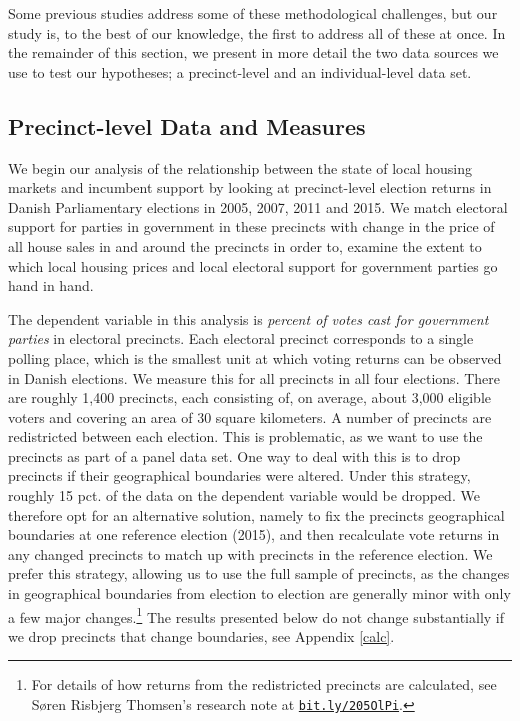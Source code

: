 \documentclass[12pt,a4paper]{article}
\begin{document}
	Some previous studies address some of these methodological challenges, but our study is, to the best of our knowledge, the first to address all of these at once. In the remainder of this section, we present in more detail the two data sources we use to test our hypotheses; a precinct-level and an individual-level data set.
	
	\subsection{Precinct-level Data and Measures}\label{precinctlevel}
	We begin our analysis of the relationship between the state of local housing markets and incumbent support by looking at precinct-level election returns in Danish Parliamentary elections in 2005, 2007, 2011 and 2015. We match electoral support for parties in government in these precincts with change in the price of all house sales in and around the precincts in order to, examine the extent to which local housing prices and local electoral support for government parties go hand in hand.
	
	The dependent variable in this analysis is \textit{percent of votes cast for government parties} in electoral precincts. Each electoral precinct corresponds to a single polling place, which is the smallest unit at which voting returns can be observed in Danish elections. We measure this for all precincts in all four elections. There are roughly 1,400 precincts, each consisting of, on average, about 3,000 eligible voters and covering an area of 30 square kilometers. A number of precincts are redistricted between each election. This is problematic, as we want to use the precincts as part of a panel data set. One way to deal with this is to drop precincts if their geographical boundaries were altered. Under this strategy, roughly 15 pct. of the data on the dependent variable would be dropped. We therefore opt for an alternative solution, namely to fix the precincts geographical boundaries at one reference election (2015), and then recalculate vote returns in any changed precincts to match up with precincts in the reference election. We prefer this strategy, allowing us to use the full sample of precincts, as the changes in geographical boundaries from election to election are generally minor with only a few major changes.\footnote{For details of how returns from the redistricted precincts are calculated, see Søren Risbjerg Thomsen's research note at \texttt{\href{http://bit.ly/205OlPi}{bit.ly/205OlPi}}.} The results presented below do not change substantially if we drop precincts that change boundaries, see Appendix \ref{calc}.
	
\end{document}
